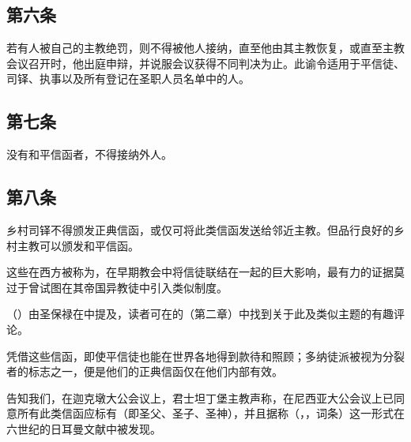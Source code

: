 
\subsection{第六条}

若有人被自己的主教绝罚，则不得被他人接纳，直至他由其主教恢复，或直至主教会议召开时，他出庭申辩，并说服会议获得不同判决为止。此谕令适用于平信徒、司铎、执事以及所有登记在圣职人员名单中的人。\par


\subsection{第七条}

没有和平信函者，不得接纳外人。\par


\subsection{第八条}

乡村司铎不得颁发正典信函，或仅可将此类信函发送给邻近主教。但品行良好的乡村主教可以颁发和平信函。\par

这些在西方被称为，在早期教会中将信徒联结在一起的巨大影响，最有力的证据莫过于曾试图在其帝国异教徒中引入类似制度。\par

（）由圣保禄在中提及，读者可在的（第二章）中找到关于此及类似主题的有趣评论。\par

凭借这些信函，即使平信徒也能在世界各地得到款待和照顾；多纳徒派被视为分裂者的标志之一，便是他们的正典信函仅在他们内部有效。\par

告知我们，在迦克墩大公会议上，君士坦丁堡主教声称，在尼西亚大公会议上已同意所有此类信函应标有（即圣父、圣子、圣神），并且据称（，，词条）这一形式在六世纪的日耳曼文献中被发现。\par


